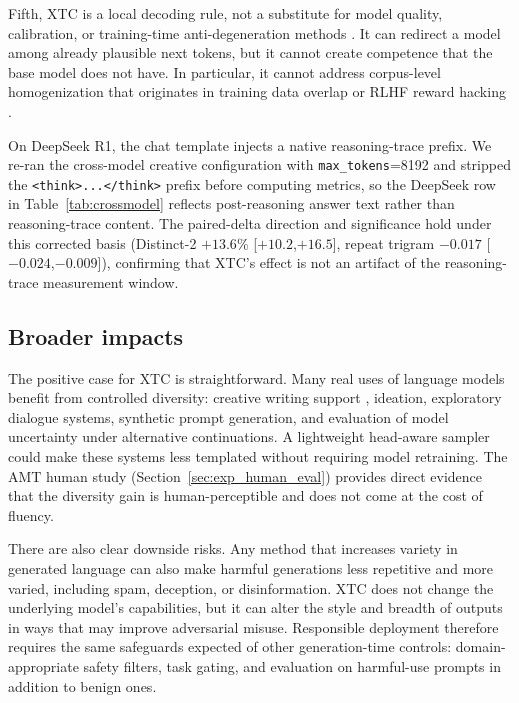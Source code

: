 \documentclass{article}
\newcommand{\xtc}{\textsc{XTC}}
\begin{document}
Fifth, \xtc{} is a local decoding rule, not a substitute for model quality, calibration, or training-time anti-degeneration methods \citep{welleck2020neural, ouyang2022training}.
It can redirect a model among already plausible next tokens, but it cannot create competence that the base model does not have.
In particular, it cannot address corpus-level homogenization that originates in training data overlap or RLHF reward hacking \citep{anderson2024homogenization, kirk2024understanding, bai2022training}.

On DeepSeek R1, the chat template injects a native reasoning-trace prefix. We re-ran the cross-model creative configuration with \texttt{max\_tokens}=8192 and stripped the \texttt{<think>...</think>} prefix before computing metrics, so the DeepSeek row in Table~\ref{tab:crossmodel} reflects post-reasoning answer text rather than reasoning-trace content.
The paired-delta direction and significance hold under this corrected basis (Distinct-2 $+13.6\%$ [$+10.2$,$+16.5$], repeat trigram $-0.017$ [$-0.024$,$-0.009$]), confirming that \xtc{}'s effect is not an artifact of the reasoning-trace measurement window.

\subsection{Broader impacts}
\label{sec:broader}

The positive case for \xtc{} is straightforward.
Many real uses of language models benefit from controlled diversity: creative writing support \citep{yuan2022wordcraft, ippolito2023creative}, ideation, exploratory dialogue systems, synthetic prompt generation, and evaluation of model uncertainty under alternative continuations.
A lightweight head-aware sampler could make these systems less templated without requiring model retraining.
The AMT human study (Section~\ref{sec:exp_human_eval}) provides direct evidence that the diversity gain is human-perceptible and does not come at the cost of fluency.

There are also clear downside risks.
Any method that increases variety in generated language can also make harmful generations less repetitive and more varied, including spam, deception, or disinformation.
\xtc{} does not change the underlying model's capabilities, but it can alter the style and breadth of outputs in ways that may improve adversarial misuse.
Responsible deployment therefore requires the same safeguards expected of other generation-time controls: domain-appropriate safety filters, task gating, and evaluation on harmful-use prompts in addition to benign ones.
\end{document}
